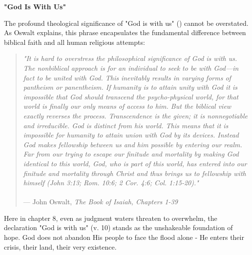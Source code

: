 \documentclass[11pt]{article}
\begin{document}
\vspace{3em}
{\large\bfseries "God Is With Us"}
\vspace{1em}

The profound theological significance of "God is with us" () cannot be overstated. As Oswalt explains, this phrase encapsulates the fundamental difference between biblical faith and all human religious attempts:

\begin{quote}
\textit{"It is hard to overstress the philosophical significance of God is with us. The nonbiblical approach is for an individual to seek to be with God—in fact to be united with God. This inevitably results in varying forms of pantheism or panentheism. If humanity is to attain unity with God it is impossible that God should transcend the psycho-physical world, for that world is finally our only means of access to him. But the biblical view exactly reverses the process. Transcendence is the given; it is nonnegotiable and irreducible. God is distinct from his world. This means that it is impossible for humanity to attain union with God by its devices. Instead God makes fellowship between us and him possible by entering our realm. Far from our trying to escape our finitude and mortality by making God identical to this world, God, who is part of this world, has entered into our finitude and mortality through Christ and thus brings us to fellowship with himself (John 3:13; Rom. 10:6; 2 Cor. 4:6; Col. 1:15-20)."}\\\\
\hfill --- John Oswalt, \textit{The Book of Isaiah, Chapters 1-39}
\end{quote}

\vspace{1em}
Here in chapter 8, even as judgment waters threaten to overwhelm, the declaration "God is with us" (v. 10) stands as the unshakeable foundation of hope. God does not abandon His people to face the flood alone - He enters their crisis, their land, their very existence.
\end{document}
